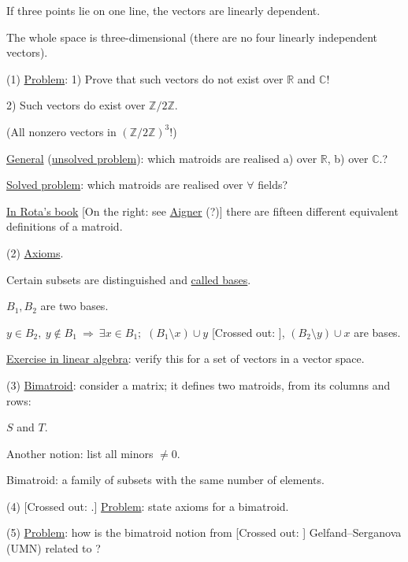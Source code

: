 If three points lie on one line, the vectors
are linearly dependent.

The whole space is three-dimensional (there are no four linearly independent vectors).

(1) \underline{Problem}: 1) Prove that such vectors do not exist over $\mathbb{R}$ and $\mathbb{C}$!

2) Such vectors do exist over $\mathbb{Z}/2\mathbb{Z}$.

(All nonzero vectors in $(\mathbb{Z}/2\mathbb{Z})^3$!)

\underline{General} (\underline{unsolved problem}): which matroids are realised
a) over $\mathbb{R}$,
b) over $\mathbb{C}$.?

\underline{Solved problem}: which matroids are realised over $\forall$ fields?

\underline{In Rota's book} 
[On the right: see  \underline{Aigner} (?)]
there are fifteen different equivalent definitions of a matroid.

(2) \underline{Axioms}.

Certain subsets are distinguished and \underline{called bases}.

$B_1,B_2$ are two bases.

$y\in B_2,\ y\notin B_1\ \Rightarrow\ \exists x\in B_1;$
$(B_1\setminus x)\cup y$
[Crossed out: ],
$(B_2\setminus y)\cup x$ are
\newline
bases.

\underline{Exercise in linear algebra}: verify this for a set of vectors in a vector space.

(3) \underline{Bimatroid}: consider a matrix; it defines two matroids, from its columns
and rows:

$S$ and $T$.

Another notion: list all minors $\ne0$.

Bimatroid: a family of subsets with the same number of elements.

(4) [Crossed out: .]
\underline{Problem}: state axioms for a bimatroid.


(5) \underline{Problem}: how is the bimatroid notion from
[Crossed out: ]
Gelfand--Serganova (UMN)
related to ?

